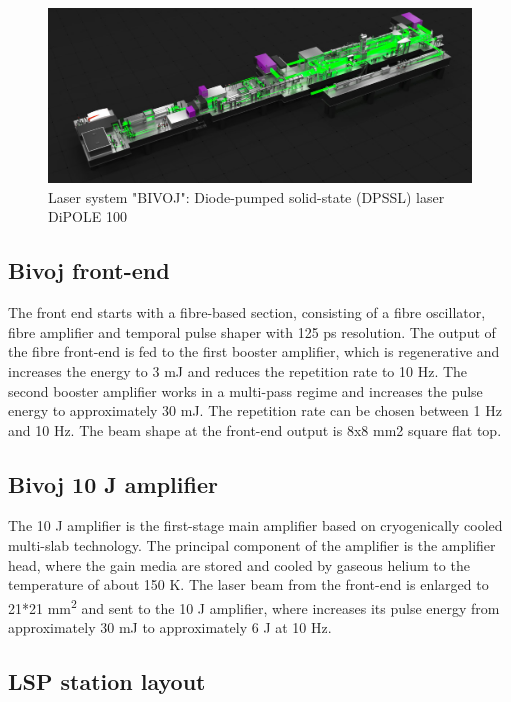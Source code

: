 \begin{figure}[h]
    \centering
    \includegraphics[width=1.0\linewidth]{img/bivoj.jpg}
    \caption{Laser system "BIVOJ": Diode-pumped solid-state (DPSSL) laser DiPOLE 100}
    \label{fig:bivoj}
\end{figure}

\subsection{Bivoj front-end}

The front end starts with a fibre-based section, consisting
of a fibre oscillator, fibre amplifier and temporal pulse shaper
with 125 ps resolution. The output of the fibre front-end is fed
to the first booster amplifier, which is regenerative and
increases the energy to 3 mJ and reduces the repetition rate to 10
Hz. The second booster amplifier works in a multi-pass regime
and increases the pulse energy to approximately 30 mJ.
The repetition rate can be chosen between 1 Hz and 10 Hz. The
beam shape at the front-end output is 8x8 mm2 square flat top.

\subsection{Bivoj 10 J amplifier}

The 10 J amplifier is the first-stage main amplifier based on
cryogenically cooled multi-slab technology. The principal
component of the amplifier is the amplifier head, where the
gain media are stored and cooled by gaseous helium to 
the temperature of about 150 K. The laser beam from the front-end
is enlarged to 21*21 mm\textsuperscript{2} and sent to the 10 J amplifier, where
increases its pulse energy from approximately 30 mJ to
approximately 6 J at 10 Hz.

\subsection{LSP station layout}

